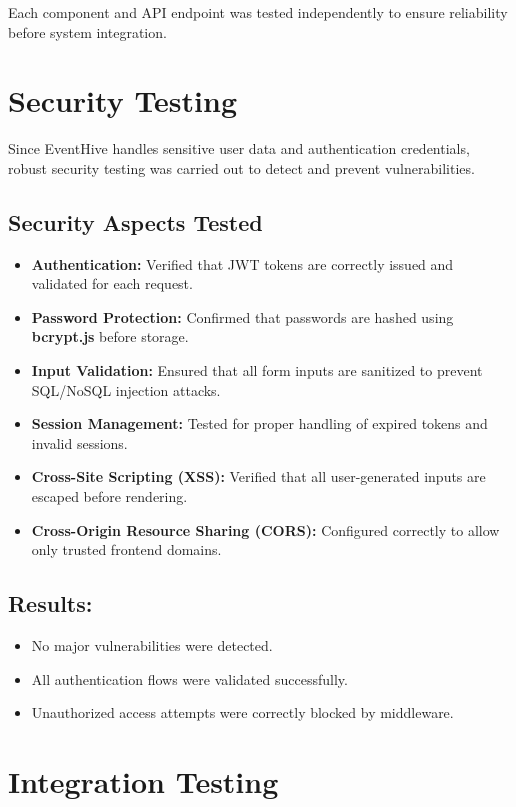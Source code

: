 \documentclass[12pt,a4paper]{report}
\begin{document}
\noindent
Each component and API endpoint was tested independently to ensure reliability before system integration.

\section{Security Testing}

Since EventHive handles sensitive user data and authentication credentials, robust security testing was carried out to detect and prevent vulnerabilities.

\subsection*{Security Aspects Tested}
\begin{itemize}
    \item \textbf{Authentication:} Verified that JWT tokens are correctly issued and validated for each request.
    \item \textbf{Password Protection:} Confirmed that passwords are hashed using \textbf{bcrypt.js} before storage.
    \item \textbf{Input Validation:} Ensured that all form inputs are sanitized to prevent SQL/NoSQL injection attacks.
    \item \textbf{Session Management:} Tested for proper handling of expired tokens and invalid sessions.
    \item \textbf{Cross-Site Scripting (XSS):} Verified that all user-generated inputs are escaped before rendering.
    \item \textbf{Cross-Origin Resource Sharing (CORS):} Configured correctly to allow only trusted frontend domains.
\end{itemize}

\subsection*{Results:}
\begin{itemize}
    \item No major vulnerabilities were detected.
    \item All authentication flows were validated successfully.
    \item Unauthorized access attempts were correctly blocked by middleware.
\end{itemize}

\section{Integration Testing}
\end{document}

